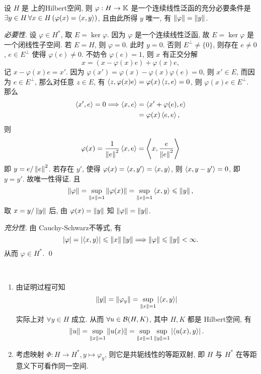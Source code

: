 \begin{Theorem}[Riesz表示定理]
	设 $ H $ 是 \K 上的Hilbert空间, 则 $ \varphi: H\to \mathbb{K} $ 是一个连续线性泛函的充分必要条件是 $ \exists y\in H\,\forall x\in H\,(\varphi(x)=\left\langle x, y \right\rangle) $, 且由此所得 $ y $ 唯一, 有 $ \left\| \varphi \right\|=\left\| y \right\| $.
\end{Theorem}

\begin{Proof}
	\textsl{必要性}. 设 $ \varphi\in H^{*} $, 取 $ E=\ker\varphi $. 因为 $ \varphi $ 是一个连续线性泛函, 故 $ E=\ker\varphi $ 是一个闭线性子空间. 若 $ E=H $, 则 $ \varphi=0 $. 此时 $ y=0 $. 否则 $ E^{\bot}\ne\{0\} $, 则存在 $ e\ne0 $, $ e\in E^{\bot} $ 使得 $ \varphi(e)\ne0 $. 不妨令 $ \varphi(e)=1 $, 则 $ x $ 有正交分解
	\[
		x=(x-\varphi(x)e)+\varphi(x)e,
	\]
	记 $ x-\varphi(x)e=x' $. 因为 $ \varphi(x')=\varphi(x)-\varphi(x)\varphi(e)=0 $, 则 $ x'\in E $, 而因为 $ e\in E^{\bot} $, 那么对任意 $ z\in E $, 有 $ \left\langle z, \varphi(x)e \right\rangle=\varphi(x)\left\langle z, e \right\rangle=0 $, 则 $ \varphi(x)e\in E^{\bot} $. 那么
	\[
		\begin{aligned}
			\left\langle x', e \right\rangle=0\Longrightarrow \left\langle x, e \right\rangle & =\left\langle x'+\varphi(e), e \right\rangle \\
			                                                & =\varphi(x)\left\langle e, e \right\rangle,
		\end{aligned}
	\]
	则
	\[
		\varphi(x)=\frac{1}{\left\| e \right\|^{2}}\left\langle x, e \right\rangle=\left\langle x, \frac{e}{\left\| e \right\|^{2}} \right\rangle
	\]
	即 $ y=e/\left\| e \right\|^{2} $. 若存在 $ y' $, 使得 $ \varphi(x)=\left\langle x, y' \right\rangle=\left\langle x, y \right\rangle $, 则 $ \left\langle x, y-y' \right\rangle=0 $, 即 $ y=y' $. 故唯一性得证. 且
	\[
		\left\| \varphi \right\|=\sup_{\left\| x \right\|=1}\left\| \varphi(x) \right\|=\sup_{\left\| x \right\|=1}\left\langle x, y \right\rangle\leqslant\left\| y \right\|,
	\]
	取 $ x=y/\left\| y \right\| $ 后, 由 $ \varphi(x)=\left\| y \right\| $ 知 $ \left\| \varphi \right\|=\left\| y \right\| $.

	\textsl{充分性}. 由 Cauchy-Schwarz不等式, 有
	\[
		\left| \varphi \right| =\left| \left\langle x, y \right\rangle \right| \leqslant\left\| x \right\|\left\| y \right\| \Longrightarrow \left\| \varphi \right\|\leqslant\left\| y \right\|<\infty.
	\]
	从而 $  \varphi\in H^{*} $. \qed
\end{Proof}

\begin{Remark}~
	\begin{enumerate}[(1)]
		\item 由证明过程可知
		      \[
			      \left\| y \right\|=\left\| \varphi_{y} \right\|=\sup_{\left\| x \right\|=1}\left| \left\langle x, y \right\rangle \right| 
		      \]
		      实际上对 $ \forall y\in H $ 成立. 从而 $ \forall u\in \mathcal{B}(H, K) $, 其中 $ H, K $ 都是 Hilbert空间, 有
		      \[
			      \left\| u \right\|=\sup_{\left\| x \right\|=1}\left\| u(x) \right\|=\sup_{\left\| x \right\|=1}\sup_{\left\| y \right\|=1}\left| \left\langle u(x), y \right\rangle \right| .
		      \]
		\item 考虑映射 $ \varPhi: H\to H^{*}, y\mapsto \varphi_{y} $, 则它是共轭线性的等距双射, 即 $ H $ 与 $ H^{*} $ 在等距意义下可看作同一空间.
	\end{enumerate}
\end{Remark}

